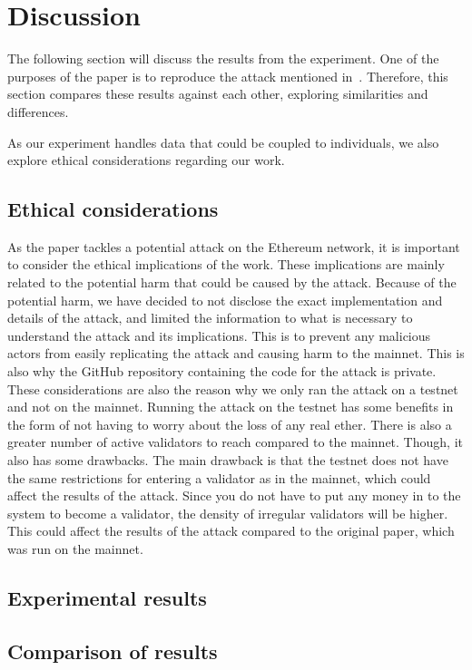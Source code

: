 

\section{Discussion}\label{sec:discussion}
The following section will discuss the results from the experiment.
One of the purposes of the paper is
to reproduce the attack mentioned in~\cite{heimbach2024deanonymizingethereumvalidatorsp2p}.
Therefore, this section compares these results against each other, exploring similarities and differences.


As our experiment handles data that could be coupled to individuals,
we also explore ethical considerations regarding our work.


\subsection{Ethical considerations}\label{subsec:ethical-considerations}
As the paper tackles a potential attack on the Ethereum network,
it is important to consider the ethical implications of the work.
These implications are mainly related to the potential harm that could be caused by the attack.
Because of the potential harm, we have decided to not disclose the exact implementation and details of the attack,
and limited the information to what is necessary to understand the attack and its implications.
This is to prevent any malicious actors from easily replicating the attack and causing harm to the mainnet.
This is also why the GitHub repository containing the code for the attack is private.
These considerations are also the reason why we only ran the attack on a testnet and not on the mainnet.
Running the attack on the testnet has some benefits in the form
of not having to worry about the loss of any real ether.
There is also a greater number of active validators to reach compared to the mainnet.
Though, it also has some drawbacks.
The main drawback is that the testnet does not have the same restrictions for entering a validator as in the mainnet,
which could affect the results of the attack.
Since you do not have to put any money in to the system to become a validator,
the density of irregular validators will be higher.
This could affect the results of the attack compared to the original paper, which was run on the mainnet.

\subsection{Experimental results}\label{subsec:expres}

\subsection{Comparison of results}\label{subsec:res-comparison}